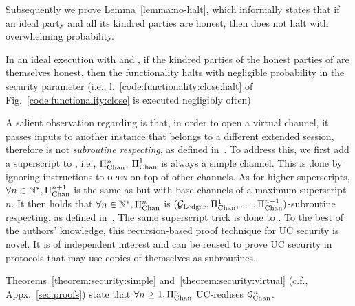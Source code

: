   Subsequently we prove Lemma~\ref{lemma:no-halt}, which informally states that
  if an ideal party and all its kindred parties are honest, then \fchan does not
  halt with overwhelming probability.

\begin{lemma}[No halt]
\label{lemma:no-halt}
  In an ideal execution with \fchan and \simulator, if the kindred parties of
  the honest parties of \fchan are themselves honest, then the functionality
  halts with negligible probability in the security parameter (i.e.,
  l.~\ref{code:functionality:close:halt} of Fig.~\ref{code:functionality:close}
  is executed negligibly often).
\end{lemma}


  A salient observation regarding \pchan is that, in order to
  open a virtual channel, it passes inputs to another \pchan instance that
  belongs to a different extended session, therefore \pchan is not
  \emph{subroutine respecting}, as defined in~\cite{uc}. To
  address this, we first add a superscript to \pchan, i.e.,
  $\Pi_{\mathrm{Chan}}^{n}$. $\Pi_{\mathrm{Chan}}^{1}$ is always a simple channel.
  This is done by ignoring instructions to \textsc{open} on top of other
  channels. As for higher superscripts, $\forall n \in
  \mathbb{N}^*, \Pi_{\mathrm{Chan}}^{n+1}$ is the same as \pchan but with
  base channels of a maximum superscript $n$. It then holds that $\forall
  n \in \mathbb{N}^*, \Pi_{\mathrm{Chan}}^{n}$ is $(\mathcal{G}_{\mathrm{Ledger}}, \Pi_{\mathrm{Chan}}^{1}, \dots,
  \Pi_{\mathrm{Chan}}^{n-1})$-subroutine respecting, as defined
  in~\cite{DBLP:conf/tcc/BadertscherCHTZ20}. The same superscript trick is done
  to \fchan. To
  the best of the authors' knowledge, this recursion-based proof technique for
  UC security is novel. It is of independent interest and can be reused to prove
  UC security in protocols that may use copies of themselves as subroutines.

  Theorems~\ref{theorem:security:simple} and~\ref{theorem:security:virtual}
  (c.f., Appx.~\ref{sec:proofs}) state
  that $\forall n \geq 1, \Pi_{\mathrm{Chan}}^{n}$ UC-realises $\mathcal{G}_{\mathrm{Chan}}^{n}$.
